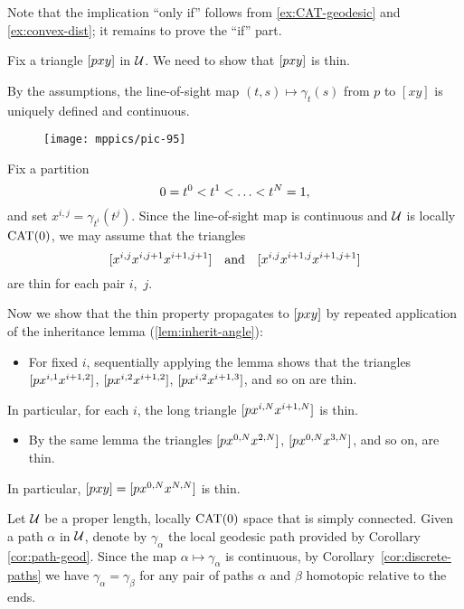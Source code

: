 Note that the implication ``only if'' follows from \ref{ex:CAT-geodesic} and \ref{ex:convex-dist}; it remains to prove the ``if'' part.

Fix a triangle $[pxy]$  in $\mathcal{U}$. 
We need to show that $[pxy]$ is thin.

By the assumptions, the line-of-sight map  $(t,s)\mapsto\gamma_t(s)$ from $p$ to   $[x y]$ is uniquely defined and continuous.    


\begin{figure}[h!]
\vskip0mm
\centering
\texttt{[image: mppics/pic-95]}
\end{figure}

Fix  a partition \[0\z=t^0\z<t^1\z<\z\dots\z<t^N=1,\] 
and set $x^{i,j}=\gamma_{t^i}(t^j)$. 
Since the line-of-sight map is continuous and $\mathcal{U}$ is locally $\mathrm{CAT}(0)$, we may assume that the triangles 
\[[x^{i,j}x^{i,j+1}x^{i+1,j+1}]\quad\text{and}\quad[x^{i,j}x^{i+1,j}x^{i+1,j+1}]\] 
are thin for each pair $i$,~$j$.

Now we show that the thin property propagates to $[pxy]$ by repeated application of the inheritance lemma (\ref{lem:inherit-angle}):
\begin{itemize}
\item 
For fixed $i$, 
sequentially applying the lemma shows that the triangles 
$[px^{i,1}x^{i+1,2}]$, 
$[px^{i,2}x^{i+1,2}]$, 
$[px^{i,2}x^{i+1,3}]$,
and so on are thin. 
\end{itemize}
In particular, for each $i$, the long triangle $[px^{i,N}x^{i+1,N}]$ is thin.
\begin{itemize} 
\item 
By the same lemma the  triangles $[px^{0,N}x^{2,N}]$, $[px^{0,N}x^{3,N}]$, and so on, are thin. 
\end{itemize}
In particular, $[pxy]=[px^{0,N}x^{N,N}]$ is thin.
\qeds

Let $\mathcal{U}$ be a proper length, locally $\mathrm{CAT}(0)$ space that is simply connected.
Given a path $\alpha$ in $\mathcal{U}$, 
denote by $\gamma_\alpha$ the local geodesic path provided by Corollary \ref{cor:path-geod}.
Since the map $\alpha\mapsto\gamma_\alpha$ is continuous, by Corollary~\ref{cor:discrete-paths}
we have $\gamma_\alpha=\gamma_\beta$ for any pair of  paths $\alpha$ and $\beta$  homotopic relative to the ends.

